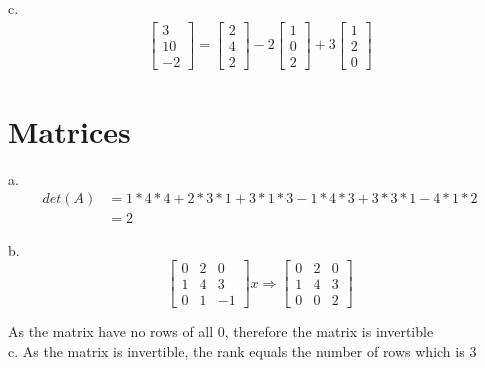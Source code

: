 \documentclass[paper=a4, fontsize=11pt]{scrartcl} %
\begin{document}
 c. 
     \[
        \begin{split}
	 \begin{bmatrix}
3\\ 
10\\ 
-2
\end{bmatrix} = 
 \begin{bmatrix}
2\\ 
4\\ 
2
\end{bmatrix} -2
 \begin{bmatrix}
1\\ 
0\\ 
2
\end{bmatrix} + 3
 \begin{bmatrix}
1\\ 
2\\ 
0
\end{bmatrix}
        \end{split}
    \]



\section{Matrices}
a.
    \[
        \begin{split}
            det(A)  &= 1*4*4 + 2*3*1 + 3*1*3 - 1*4*3 + 3*3*1 - 4*1*2
            \\
            &= 2
        \end{split}
    \]

b.
    \[
\begin{bmatrix}
0 & 2 & 0\\ 
1 & 4 & 3\\ 
0 & 1 & -1
\end{bmatrix} x
\Rightarrow
\begin{bmatrix}
0 & 2 & 0\\ 
1 & 4 & 3\\ 
0 & 0 & 2
\end{bmatrix}
    \]

As the matrix have no rows of all 0, therefore the matrix is invertible\\

c.
As the matrix is invertible, the rank equals the number of rows which is 3

\end{document}
